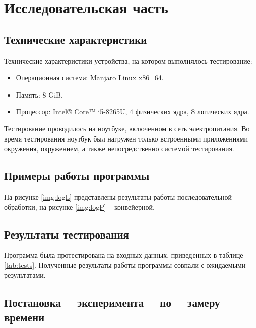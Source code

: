 \chapter{Исследовательская часть}

\section{Технические характеристики}

Технические характеристики устройства, на котором выполнялось тестирование:

\begin{itemize}
	\item Операционная система: Manjaro \cite{manjaro} Linux x86\_64.
	\item Память: 8 GiB.
    \item Процессор: Intel® Core™ i5-8265U, 4 физических ядра, 8 логических
        ядра\cite{intel}.
\end{itemize}

Тестирование проводилось на ноутбуке, включенном в сеть электропитания. Во
время тестирования ноутбук был нагружен только встроенными приложениями
окружения, окружением, а также непосредственно системой тестирования.

\section{Примеры работы программы}

На рисунке \ref{img:logL} представлены результаты работы последовательной
обработки, на рисунке \ref{img:logP} -- конвейерной.



\section{Результаты тестирования}

Программа была протестирована на входных данных, приведенных в таблице
\ref{tab:tests}. Полученные результаты работы программы совпали с ожидаемыми
результатами.

\section[Постановка эксперимента по замеру времени]
        {Постановка ~~эксперимента ~~по ~~замеру времени}

